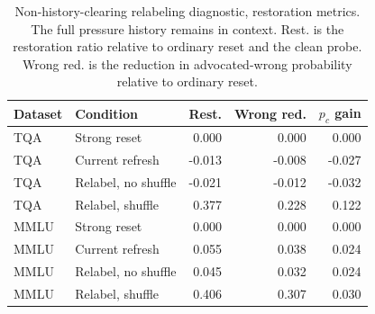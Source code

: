 \begin{table}[t]
\centering
\footnotesize
\setlength{\tabcolsep}{2pt}
\renewcommand{\arraystretch}{1.05}
\begin{tabular}{llrrr}
\hline
Dataset & Condition & Rest. & Wrong red. & $p_c$ gain \\
\hline
TQA & Strong reset & 0.000 & 0.000 & 0.000 \\
TQA & Current refresh & -0.013 & -0.008 & -0.027 \\
TQA & Relabel, no shuffle & -0.021 & -0.012 & -0.032 \\
TQA & Relabel, shuffle & 0.377 & 0.228 & 0.122 \\
\hline
MMLU & Strong reset & 0.000 & 0.000 & 0.000 \\
MMLU & Current refresh & 0.055 & 0.038 & 0.024 \\
MMLU & Relabel, no shuffle & 0.045 & 0.032 & 0.024 \\
MMLU & Relabel, shuffle & 0.406 & 0.307 & 0.030 \\
\hline
\end{tabular}
\caption{Non-history-clearing relabeling diagnostic, restoration metrics. The full pressure history remains in context. Rest. is the restoration ratio relative to ordinary reset and the clean probe. Wrong red. is the reduction in advocated-wrong probability relative to ordinary reset.}
\label{tab:non-history-clearing-recovery-a}
\end{table}